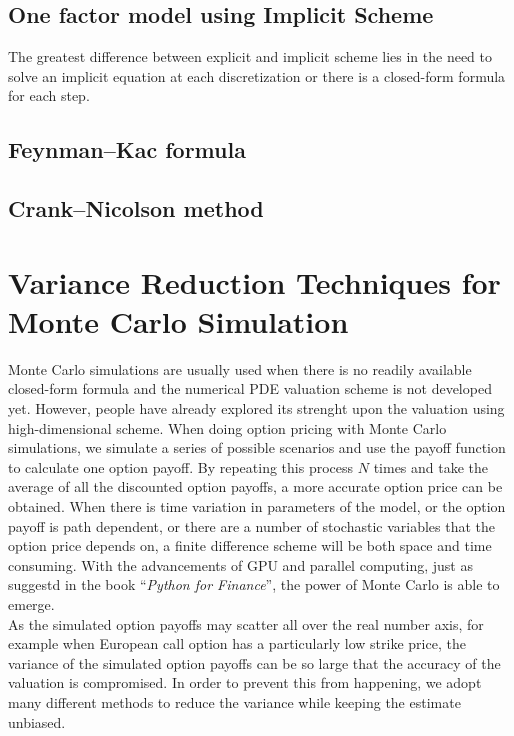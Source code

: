 \subsection{One factor model using Implicit Scheme}
The greatest difference between explicit and implicit scheme lies in the need to solve an implicit equation at each discretization or there is a closed-form formula for each step.


\newpage
\subsection{Feynman–Kac formula}
\newpage
\subsection{Crank–Nicolson method}
\newpage

\section{Variance Reduction Techniques for Monte Carlo Simulation}
Monte Carlo simulations are usually used when there is no readily available closed-form formula and the numerical PDE valuation scheme is not developed yet. However, people have already explored its strenght upon the valuation using high-dimensional scheme. When doing option pricing with Monte Carlo simulations, we simulate a series of possible scenarios and use the payoff function to calculate one option payoff. By repeating this process $N$ times and take the average of all the discounted option payoffs, a more accurate option price can be obtained. When there is time variation in parameters of the model, or the option payoff is path dependent, or there are a number of stochastic variables that the option price depends on, a finite difference scheme will be both space and time consuming. With the advancements of GPU and parallel computing, just as suggestd in the book ``\emph{Python for Finance}'', the power of Monte Carlo is able to emerge.\\
As the simulated option payoffs may scatter all over the real number axis, for example when European call option has a particularly low strike price, the variance of the simulated option payoffs can be so large that the accuracy of the valuation is compromised. In order to prevent this from happening, we adopt many different methods to reduce the variance while keeping the estimate unbiased.
\newpage
